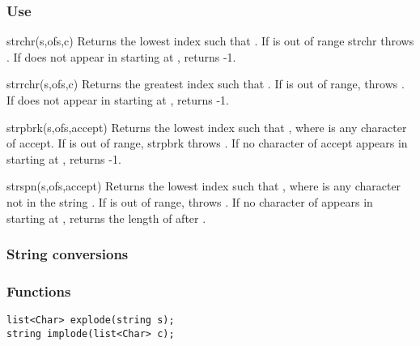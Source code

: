 \subsubsection*{Use}

\begin{defun}{strchr}{(s,ofs,c)}
Returns the lowest index  such that
.  If  is out of range strchr
throws .  If  does not
appear in  starting at ,  returns -1.
\end{defun}

\begin{defun}{strrchr}{(s,ofs,c)}
Returns the greatest index  such that
.  If  is out of range,
 throws .  If
 does not appear in  starting at , 
returns -1.
\end{defun}

\begin{defun}{strpbrk}{(s,ofs,accept)}
Returns the lowest index  such that
, where  is any character of
accept.  If  is out of range, strpbrk throws
.  If no character of accept
appears in  starting at ,  returns -1.
\end{defun}

\begin{defun}{strspn}{(s,ofs,accept)}
Returns the lowest index  such that
, where  is any character not
in the string .  If  is out of range, 
throws .  If no character of
 appears in  starting at , 
returns the length of  after .
\end{defun}


\subsubsection*{String conversions}
\subsubsection*{Functions}
\begin{verbatim}
list<Char> explode(string s);
string implode(list<Char> c);
\end{verbatim}


